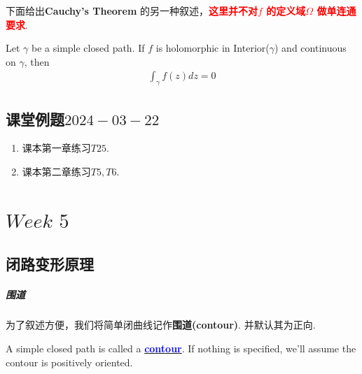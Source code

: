 	\newpage
	下面给出\textbf{Cauchy's Theorem} 的另一种叙述，\textcolor{red}{\textbf{这里并不对$f$ 的定义域$\Omega$ 做单连通要求}}.
	\begin{thm}\label{thm 4.3.3}
		Let $\gamma$ be a simple closed path. If $f$ is holomorphic in Interior($\gamma$) and continuous on $\gamma$, then
		\begin{align}
			\int_{\gamma}{f(z) dz} = 0
		\end{align}
	\end{thm}

\newpage
\section{课堂例题$2024-03-22$}
	\begin{enumerate}
		\item 课本第一章练习$T25$.
		
		\vspace{2em}
		
		\item 课本第二章练习$T5 , T6$.
	\end{enumerate}

\chapter{$Week \,\, 5$}
\section{闭路变形原理}
\paragraph{围道}
	为了叙述方便，我们将简单闭曲线记作\textbf{围道(contour)}. 并默认其为正向.
	\begin{defn}\label{def 5.1.1}
		A simple closed path is called a \underline{\textcolor{blue}{\textbf{contour}}}. If nothing is specified, we'll assume the contour is positively oriented.
	\end{defn}

\vspace{2em}
